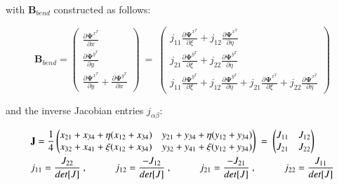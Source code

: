 with $\mathbf{B}_{bend}$ constructed as follows:

\begin{equation} 
\mathbf{B}_{bend} =
\begin{pmatrix}
\frac{\partial \mathbf{\Psi}^{x^T}}{\partial x} \\
\frac{\partial \mathbf{\Psi}^{y^T}}{\partial y} \\
\frac{\partial \mathbf{\Psi}^{x^T}}{\partial y} + \frac{\partial \mathbf{\Psi}^{y^T}}{\partial x}
\end{pmatrix}
\ =\ 
\begin{pmatrix}
j_{11} \frac{\partial \mathbf{\Psi}^{x^T}}{\partial \xi}  + j_{12} \frac{\partial \mathbf{\Psi}^{x^T}}{\partial \eta}  \\
j_{21} \frac{\partial \mathbf{\Psi}^{y^T}}{\partial \xi} + j_{22} \frac{\partial \mathbf{\Psi}^{y^T}}{\partial \eta} \\
j_{11} \frac{\partial \mathbf{\Psi}^{y^T}}{\partial \xi}  + j_{12} \frac{\partial \mathbf{\Psi}^{y^T}}{\partial \eta} + j_{21} \frac{\partial \mathbf{\Psi}^{x^T}}{\partial \xi} + j_{22} \frac{\partial \mathbf{\Psi}^{x^T}}{\partial \eta}
\end{pmatrix}
\label{equation28}
\end{equation}

and the inverse Jacobian entries $j_{\alpha \beta}$:

\begin{gather} 
	\begin{aligned}
		&\mathbf{J} = \frac{1}{4}
		\begin{pmatrix}
			x_{21} + x_{34} + \eta (x_{12} + x_{34}) & y_{21} + y_{34} + \eta (y_{12} + y_{34}) \\
			x_{32} + x_{41} + \xi (x_{12} + x_{34}) & y_{32} + y_{41} + \xi (y_{12} + y_{34})
		\end{pmatrix}
		\ = \ 
		\begin{pmatrix}
			J_{11} & J_{12} \\
			J_{21} & J_{22}
		\end{pmatrix} \\
		&j_{11} = \frac{J_{22}}{det[J]}\ ,
		\hspace{10mm}
		j_{12} = \frac{-J_{12}}{det[J]}\ ,
		\hspace{10mm}
		j_{21} = \frac{-J_{21}}{det[J]}\ ,
		\hspace{10mm}
		j_{22} = \frac{J_{11}}{det[J]}
		\label{equation29}
	\end{aligned}
\end{gather}




